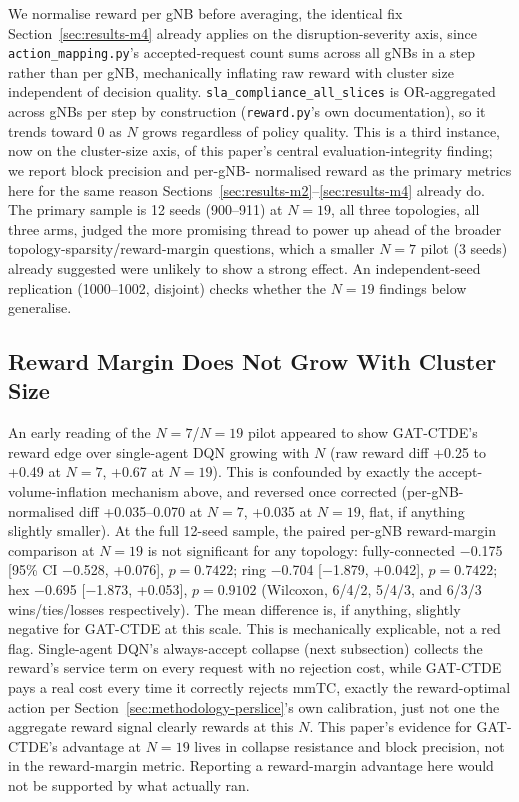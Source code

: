\documentclass[journal]{IEEEtran}
\begin{document}
We normalise reward per gNB before averaging, the identical fix
Section~\ref{sec:results-m4} already applies on the disruption-severity
axis, since \texttt{action\_mapping.py}'s accepted-request count sums
across all gNBs in a step rather than per gNB, mechanically inflating
raw reward with cluster size independent of decision quality.
\texttt{sla\_compliance\_all\_slices} is OR-aggregated across gNBs per
step by construction (\texttt{reward.py}'s own documentation), so it
trends toward 0 as $N$ grows regardless of policy quality. This is a third
instance, now on the cluster-size axis, of this paper's central
evaluation-integrity finding; we report block precision and per-gNB-
normalised reward as the primary metrics here for the same reason
Sections~\ref{sec:results-m2}--\ref{sec:results-m4} already do. The
primary sample is 12 seeds (900--911) at $N=19$, all three topologies,
all three arms, judged the more promising thread to power up ahead of
the broader topology-sparsity/reward-margin questions, which a smaller
$N=7$ pilot (3 seeds) already suggested were unlikely to show a strong
effect. An independent-seed replication (1000--1002, disjoint) checks
whether the $N=19$ findings below generalise.

\subsection{Reward Margin Does Not Grow With Cluster Size}
An early reading of the $N=7$/$N=19$ pilot appeared to show GAT-CTDE's
reward edge over single-agent DQN growing with $N$ (raw reward diff
+0.25 to +0.49 at $N=7$, +0.67 at $N=19$). This is confounded by exactly the
accept-volume-inflation mechanism above, and reversed once corrected
(per-gNB-normalised diff +0.035--0.070 at $N=7$, +0.035 at $N=19$,
flat, if anything slightly smaller). At the full 12-seed sample, the
paired per-gNB reward-margin comparison at $N=19$ is not significant
for any topology: fully-connected $-$0.175 [95\% CI $-$0.528, +0.076],
$p=0.7422$; ring $-$0.704 [$-$1.879, +0.042], $p=0.7422$; hex $-$0.695
[$-$1.873, +0.053], $p=0.9102$ (Wilcoxon, 6/4/2, 5/4/3, and 6/3/3
wins/ties/losses respectively). The mean difference is, if anything,
slightly negative for GAT-CTDE at this scale. This is mechanically
explicable, not a red flag. Single-agent DQN's always-accept collapse
(next subsection) collects the reward's service term on every request
with no rejection cost, while GAT-CTDE pays a real cost every time it
correctly rejects mmTC, exactly the reward-optimal action per
Section~\ref{sec:methodology-perslice}'s own calibration, just not one
the aggregate reward signal clearly rewards at this $N$. This paper's
evidence for GAT-CTDE's advantage at $N=19$ lives in collapse
resistance and block precision, not in the reward-margin metric.
Reporting a reward-margin advantage here would not be supported by
what actually ran.
\end{document}

